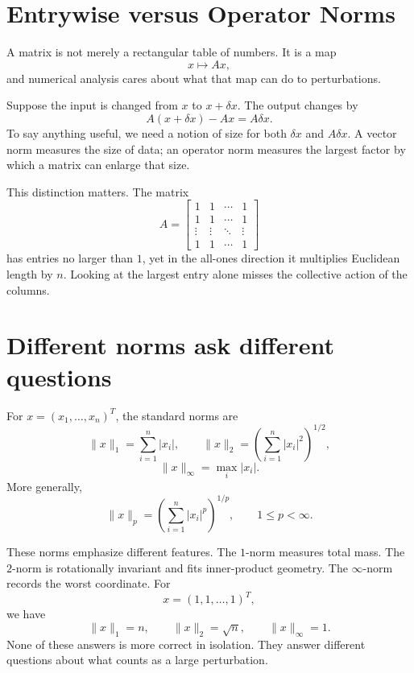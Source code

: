 
\section{Entrywise versus Operator Norms}

A matrix is not merely a rectangular table of numbers.  It is a map
\[
  x\longmapsto Ax,
\]
and numerical analysis cares about what that map can do to perturbations.

Suppose the input is changed from \(x\) to \(x+\delta x\).  The output changes by
\[
  A(x+\delta x)-Ax=A\delta x.
\]
To say anything useful, we need a notion of size for both \(\delta x\) and \(A\delta x\).  A vector norm measures the size of data; an operator norm measures the largest factor by which a matrix can enlarge that size.

This distinction matters.  The matrix
\[
  A=
  \begin{bmatrix}
    1&1&\cdots&1\\
    1&1&\cdots&1\\
    \vdots&\vdots&\ddots&\vdots\\
    1&1&\cdots&1
  \end{bmatrix}
\]
has entries no larger than \(1\), yet in the all-ones direction it multiplies Euclidean length by \(n\).  Looking at the largest entry alone misses the collective action of the columns.

\section{Different norms ask different questions}

For \(x=(x_1,\ldots,x_n)^T\), the standard norms are
\[
  \|x\|_1=\sum_{i=1}^n|x_i|,
  \qquad
  \|x\|_2=\left(\sum_{i=1}^n|x_i|^2\right)^{1/2},
\]
\[
  \|x\|_\infty=\max_i|x_i|.
\]
More generally,
\[
  \|x\|_p=\left(\sum_{i=1}^n|x_i|^p\right)^{1/p},
  \qquad 1\le p<\infty.
\]

These norms emphasize different features.  The \(1\)-norm measures total mass.  The \(2\)-norm is rotationally invariant and fits inner-product geometry.  The \(\infty\)-norm records the worst coordinate.  For
\[
  x=(1,1,\ldots,1)^T,
\]
we have
\[
  \|x\|_1=n,
  \qquad
  \|x\|_2=\sqrt n,
  \qquad
  \|x\|_\infty=1.
\]
None of these answers is more correct in isolation.  They answer different questions about what counts as a large perturbation.

